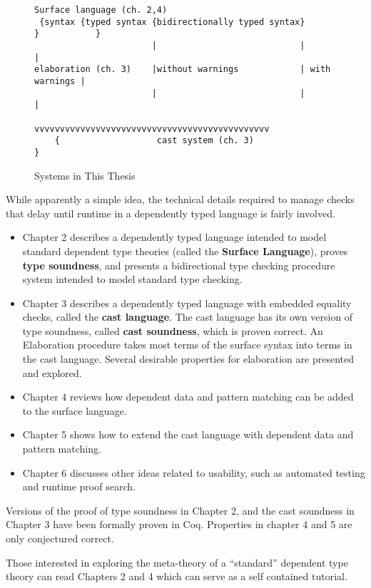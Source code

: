 \begin{figure}
\begin{lstlisting}
Surface language (ch. 2,4)
 {syntax {typed syntax {bidirectionally typed syntax}       }           }
                       |                            |               |
elaboration (ch. 3)    |without warnings            | with warnings |
                       |                            |               |
                       vvvvvvvvvvvvvvvvvvvvvvvvvvvvvvvvvvvvvvvvvvvvvv
    {                   cast system (ch. 3)                             }

\end{lstlisting}


\caption{Systems in This Thesis}
\label{fig:intro-thesis-workflow-1}
\end{figure}

While apparently a simple idea, the technical details required to manage checks that delay until runtime in a dependently typed language is fairly involved. 

\begin{itemize}
\item Chapter 2 describes a dependently typed language intended to model standard dependent type theories (called the\textbf{ Surface Language}), proves \textbf{type soundness}, and presents a bidirectional type checking procedure system intended to model standard type checking. 
\item Chapter 3 describes a dependently typed language with embedded equality checks, called the \textbf{cast language}.
The cast language has its own version of type soundness, called \textbf{cast soundness}, which is proven correct.
An Elaboration procedure takes most terms of the surface syntax into terms in the cast language.
Several desirable properties for elaboration are presented and explored.
\item Chapter 4 reviews how dependent data and pattern matching can be added to the surface language.
\item Chapter 5 shows how to extend the cast language with dependent data and pattern matching. 
\item Chapter 6 discusses other ideas related to usability, such as automated testing and runtime proof search.
\end{itemize}
Versions of the proof of type soundness in Chapter 2, and the cast soundness in Chapter 3 have been formally proven in Coq.
Properties in chapter 4 and 5 are only conjectured correct.

Those interested in exploring the meta-theory of a ``standard'' dependent type theory can read Chapters 2 and 4 which can serve as a self contained tutorial.

% 
% 

